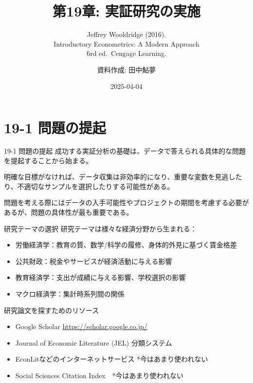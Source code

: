 \documentclass[
  ignorenonframetext,
]{beamer}
\title{第19章: 実証研究の実施}
\subtitle{Jeffrey Wooldridge (2016).\\
Introductory Econometrics: A Modern Approach\\
6rd ed.~Cengage Learning.}
\author{資料作成: 田中鮎夢}
\date{2025-04-04}
\providecommand{\tightlist}{%
  \setlength{\itemsep}{0pt}\setlength{\parskip}{0pt}}
\begin{document}
\frame{\titlepage}

\section{19-1 問題の提起}\label{ux554fux984cux306eux63d0ux8d77}

\begin{frame}{19-1 問題の提起}
\label{ux554fux984cux306eux63d0ux8d77-1}
成功する実証分析の基礎は、データで答えられる具体的な問題を提起することから始まる。

明確な目標がなければ、データ収集は非効率的になり、重要な変数を見逃したり、不適切なサンプルを選択したりする可能性がある。

問題を考える際にはデータの入手可能性やプロジェクトの期間を考慮する必要があるが、問題の具体性が最も重要である。
\end{frame}

\begin{frame}{研究テーマの選択}
\label{ux7814ux7a76ux30c6ux30fcux30deux306eux9078ux629e}
研究テーマは様々な経済分野から生まれる：

\begin{itemize}
\tightlist
\item
  労働経済学：教育の質、数学/科学の履修、身体的外見に基づく賃金格差
\item
  公共財政：税金やサービスが経済活動に与える影響
\item
  教育経済学：支出が成績に与える影響、学校選択の影響
\item
  マクロ経済学：集計時系列間の関係
\end{itemize}
\end{frame}

\begin{frame}{研究論文を探すためのリソース}
\label{ux7814ux7a76ux8ad6ux6587ux3092ux63a2ux3059ux305fux3081ux306eux30eaux30bdux30fcux30b9}
\begin{itemize}
\tightlist
\item
  Google Scholar \url{https://scholar.google.co.jp/}
\item
  Journal of Economic Literature (JEL) 分類システム
\item
  EconLitなどのインターネットサービス *今はあまり使われない
\item
  Social Sciences Citation Index　*今はあまり使われない
\end{itemize}
\end{frame}
\end{document}
